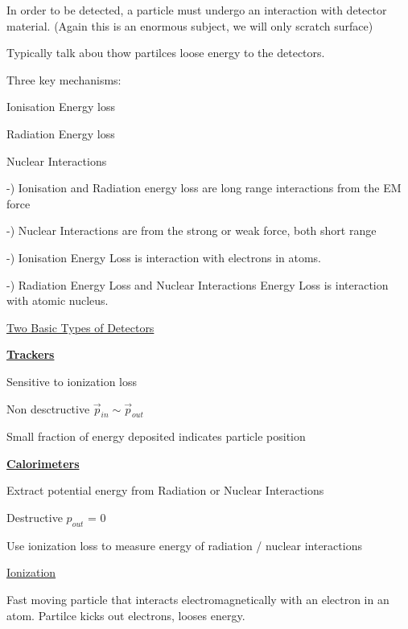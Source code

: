 {In order to be detected, a particle must undergo an interaction with detector material.
(Again this is an enormous subject, we will only scratch surface)


Typically talk abou thow partilces loose energy to the detectors. 

Three key mechanisms:

{\Large
\bi
\item[-] Ionisation Energy loss 
\item[-] Radiation Energy loss 
\item[-] Nuclear Interactions
\ei
}

-) Ionisation and Radiation energy loss are long range interactions from the EM force

-) Nuclear Interactions are from the strong or weak force, both short range

-) Ionisation Energy Loss is interaction with electrons in atoms.

-) Radiation Energy Loss and Nuclear Interactions Energy Loss is interaction with atomic nucleus.


\underline{Two Basic Types of Detectors}

\textbf{\underline{Trackers} }
\bi
\item[-] Sensitive to ionization loss
\item[-] Non desctructive $\vec{p}_{in} \sim \vec{p}_{out}$
\item[-] Small fraction of energy deposited indicates particle position
\ei


\textbf{\underline{Calorimeters} }
\bi
\item[-] Extract potential energy from Radiation or Nuclear Interactions 
\item[-] Destructive $p_{out}$ = 0
\item[-] Use ionization loss to measure energy of radiation / nuclear interactions 
\ei


\lineacross

\underline{Ionization}

Fast moving particle that interacts electromagnetically with  an electron in an atom.
Partilce kicks out electrons, looses energy.

}
